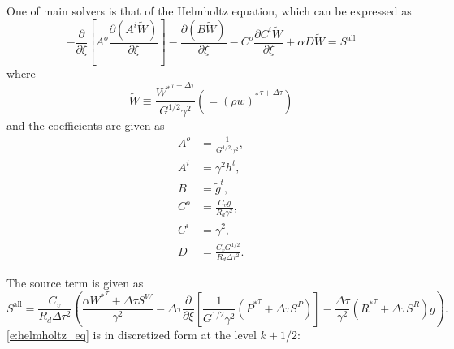 One of main solvers is that of the Helmholtz equation, which can be
expressed as
%
\begin{equation}
 - \frac{\partial}{\partial\xi}
 \left[ A^o \frac{\partial(A^i\tilde{W})}{\partial\xi} \right]
 - \frac{\partial(B\tilde{W})}{\partial\xi}
 - C^o \frac{\partial C^i\tilde{W}}{\partial\xi}
 + \alpha D \tilde{W} = S^\text{all}
\label{e:helmholtz_eq}
\end{equation}
%
where
%
\begin{equation}
 \tilde{W} \equiv \frac{{W^* }^{\tau + \Delta \tau}  }{G^{1/2} \gamma^2}
 \left( = {(\rho w)^* }^{\tau + \Delta \tau}\right)
\end{equation}
%
and the coefficients are given as
%
\begin{align}
 A^o &= \frac{1}{G^{1/2}\gamma^2},\\
 A^i &= \gamma^2 h^t,\\
 B   &= \tilde{g}^t, \\
 C^o &= \frac{C_v g}{R_d \gamma^2},\\
 C^i &= \gamma^2, \\
 D   &= \frac{C_v G^{1/2}}{R_d \Delta \tau ^2}.
\end{align}

The source term is given as
\begin{equation}
 S^\text{all} = \frac{C_v}{R_d \Delta \tau^2}
  \left(\frac{\alpha{W^*}^\tau+\Delta \tau S^W}{\gamma^2}
   -\Delta \tau \frac{\partial}{\partial\xi}
   \left[ \frac{1}{G^{1/2}\gamma^2}({P^*}^\tau + \Delta \tau S^P) \right]
-\frac{\Delta \tau}{\gamma^2}({R^*}^\tau + \Delta \tau S^R)g
\right).
\end{equation}
%
\autoref{e:helmholtz_eq} is in discretized form at the level
$k+1/2$:

